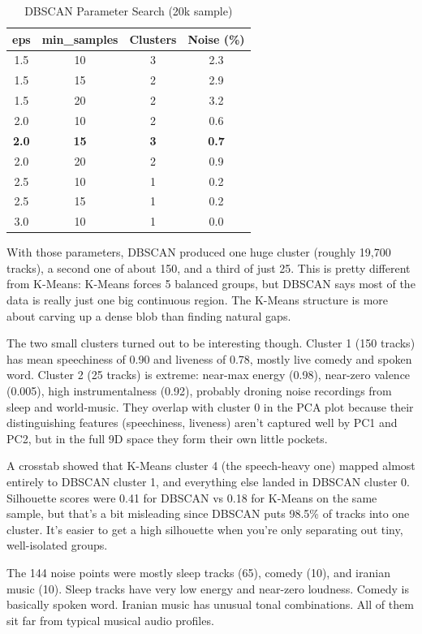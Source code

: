 \documentclass[10pt,twocolumn]{article}
\begin{document}
\begin{table}[htbp]
\caption{DBSCAN Parameter Search (20k sample)}
\label{tab:dbscan}
\centering
\footnotesize
\begin{tabular}{@{}cccc@{}}
\toprule
\textbf{eps} & \textbf{min\_samples} & \textbf{Clusters} & \textbf{Noise (\%)} \\
\midrule
1.5 & 10 & 3 & 2.3 \\
1.5 & 15 & 2 & 2.9 \\
1.5 & 20 & 2 & 3.2 \\
2.0 & 10 & 2 & 0.6 \\
\textbf{2.0} & \textbf{15} & \textbf{3} & \textbf{0.7} \\
2.0 & 20 & 2 & 0.9 \\
2.5 & 10 & 1 & 0.2 \\
2.5 & 15 & 1 & 0.2 \\
3.0 & 10 & 1 & 0.0 \\
\bottomrule
\end{tabular}
\end{table}

With those parameters, DBSCAN produced one huge cluster (roughly 19,700 tracks), a second one of about 150, and a third of just 25. This is pretty different from K-Means: K-Means forces 5 balanced groups, but DBSCAN says most of the data is really just one big continuous region. The K-Means structure is more about carving up a dense blob than finding natural gaps.

The two small clusters turned out to be interesting though. Cluster 1 (150 tracks) has mean speechiness of 0.90 and liveness of 0.78, mostly live comedy and spoken word. Cluster 2 (25 tracks) is extreme: near-max energy (0.98), near-zero valence (0.005), high instrumentalness (0.92), probably droning noise recordings from sleep and world-music. They overlap with cluster 0 in the PCA plot because their distinguishing features (speechiness, liveness) aren't captured well by PC1 and PC2, but in the full 9D space they form their own little pockets.

A crosstab showed that K-Means cluster 4 (the speech-heavy one) mapped almost entirely to DBSCAN cluster 1, and everything else landed in DBSCAN cluster 0. Silhouette scores were 0.41 for DBSCAN vs 0.18 for K-Means on the same sample, but that's a bit misleading since DBSCAN puts 98.5\% of tracks into one cluster. It's easier to get a high silhouette when you're only separating out tiny, well-isolated groups.

The 144 noise points were mostly sleep tracks (65), comedy (10), and iranian music (10). Sleep tracks have very low energy and near-zero loudness. Comedy is basically spoken word. Iranian music has unusual tonal combinations. All of them sit far from typical musical audio profiles.
\end{document}
